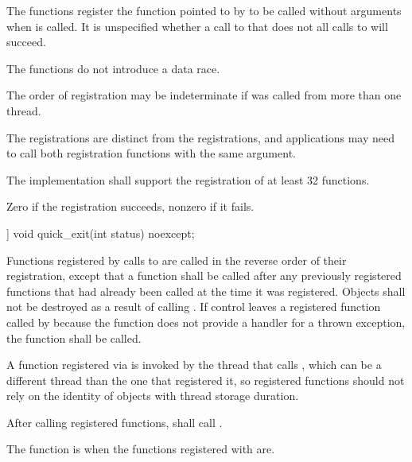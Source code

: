 \begin{itemdescr}
\pnum
\effects
The  functions register the function pointed to by 
to be called without arguments when  is called.
It is unspecified whether a call to  that does not
all calls to  will succeed.
\begin{note}
The
 functions do not introduce a
data race.
\end{note}
\begin{note}
The order of registration may be indeterminate if  was called from more
than one thread.
\end{note}
\begin{note}
The
 registrations are distinct from the  registrations,
and applications may need to call both registration functions with the same argument.
\end{note}

\pnum
\implimits
The implementation shall support the registration of at least 32 functions.

\pnum
\returns
Zero if the registration succeeds, nonzero if it fails.
\end{itemdescr}

%
\begin{itemdecl}
[[noreturn]] void quick_exit(int status) noexcept;
\end{itemdecl}

\begin{itemdescr}
\pnum
\effects
Functions registered by calls to  are called in the
reverse order of their registration, except that a function shall be called after any
previously registered functions that had already been called at the time it was
registered. Objects shall not be destroyed as a result of calling .
If control leaves a registered function called by  because the
function does not provide a handler for a thrown exception, the function  shall
be called.
\begin{note}
A function registered via 
is invoked by the thread that calls ,
which can be a different thread
than the one that registered it, so registered functions should not rely on the identity
of objects with thread storage duration.
\end{note}
After calling registered functions,  shall call .

\pnum
\remarks
{}%
The function  is 
when the functions registered with  are.
\end{itemdescr}

